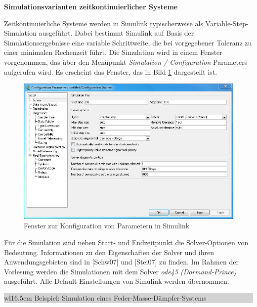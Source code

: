 {\selectfont
\noindent\textbf{Simulationsvarianten zeitkontinuierlicher Systeme}}\smallskip

\noindent Zeitkontinuierliche Systeme werden in Simulink typischerweise als Variable-Step-Simulation ausgeführt. Dabei bestimmt Simulink auf Basis der Simulationsergebnisse eine variable Schrittweite, die bei vorgegebener Toleranz zu einer minimalen Rechenzeit führt. Die Simulation wird in einem Fenster vorgenommen, das über den Menüpunkt \textit{Simulation / Configuration}  Parameters aufgerufen wird. Es erscheint das Fenster, das in Bild \ref{fig:SimulinkParameters} dargestellt ist.

\begin{figure}[H]
  \centerline{\includegraphics[width=1\textwidth]{Kapitel2/Bilder/image35}}
  \caption{Fenster zur Konfiguration von Parametern in Simulink}
  \label{fig:SimulinkParameters}
\end{figure}

\noindent Für die Simulation sind neben Start- und Endzeitpunkt die Solver-Optionen von Bedeutung. Informationen zu den Eigenschaften der Solver und ihren Anwendungsgebieten sind in [Schw07] und [Stei07] zu finden. Im Rahmen der Vorlesung werden die Simulationen mit dem Solver \textit{ode45 (Dormand-Prince)} ausgeführt. Alle Default-Einstellungen von Simulink werden übernommen.\bigskip

\noindent
\colorbox{lightgray}{%
%
\renewcommand\arraystretch{0.6}%
\begin{tabular}{ wl{16.5cm} }
{\selectfont
\noindent
Beispiel: Simulation eines Feder-Masse-Dämpfer-Systems}
\end{tabular}%
}\bigskip

